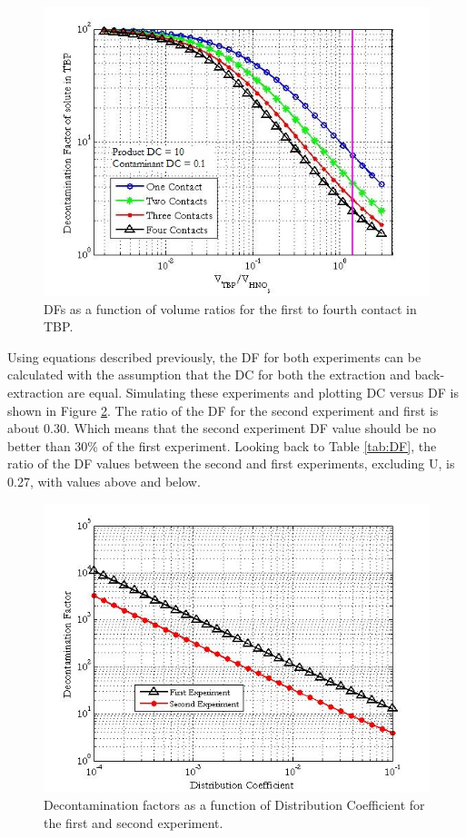 \documentclass[review]{elsarticle}
\begin{document}
\begin{figure}[h!]
	\centerline{\includegraphics[scale=0.75]{TBP}}
	\caption{DFs as a function of volume ratios for the first to fourth contact in TBP.}
	\label{fig:TBP}
\end{figure}

Using equations described previously, the DF for both
experiments can be calculated with the assumption that the DC for both the extraction and back-extraction
are equal. Simulating these experiments and plotting DC versus DF is 
shown in Figure \ref{fig:four}.
The ratio of the DF for the second experiment and first is about 0.30.  
Which means that the second experiment DF value should be no better than 30\% of the first experiment. 
Looking back to Table \ref{tab:DF}, the ratio of the DF values between the second and first 
experiments, excluding U, is 0.27, with values above and below. 

\begin{figure}[h!]
	\centerline{\includegraphics[scale=0.6]{four_contact}}
	\caption{Decontamination factors as a function of Distribution Coefficient for the first and second experiment.}
	\label{fig:four}
\end{figure}
\end{document}
